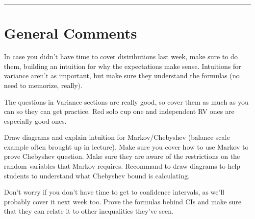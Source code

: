 \documentclass{exam}
\title{}
\date{Distributions, Variance, Inequalities, Confidence Intervals}
\begin{document}
\maketitle
\rule{\textwidth}{0.15em}
\fontsize{12}{15}\selectfont
\thispagestyle{empty}

\section{General Comments}
\begin{questions}
\item In case you didn't have time to cover distributions last week, make sure to do them, building an intuition for why the expectations make sense. Intuitions for variance aren't as important, but make sure they understand the formulas (no need to memorize, really).

\item The questions in Variance sections are really good, so cover them as much as you can so they can get practice. Red solo cup one and independent RV ones are especially good ones.

\item Draw diagrams and explain intuition for Markov/Chebyshev (balance scale example often brought up in lecture). Make sure you cover how to use Markov to prove Chebyshev question. Make sure they are aware of the restrictions on the random variables that Markov requires. Recommand to draw diagrams to help students to understand what Chebyshev bound is calculating.

\item Don't worry if you don't have time to get to confidence intervals, as we'll probably cover it next week too. Prove the formulas behind CIs and make sure that they can relate it to other inequalities they've seen.






\end{questions}
\end{document}
